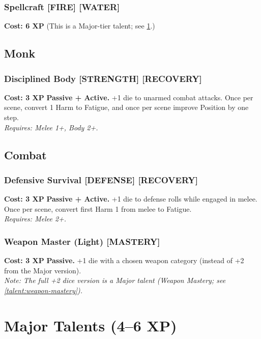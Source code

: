 \subsubsection*{Spellcraft \textnormal{[FIRE] [WATER]}}
\label{talent:spellcraft}
\textbf{Cost: 6 XP} (This is a Major-tier talent; see \ref{sec:major-talents}.)

\subsection*{Monk}
\label{sec:minor-monk}

\subsubsection*{Disciplined Body \textnormal{[STRENGTH] [RECOVERY]}}
\label{talent:disciplined-body}
\textbf{Cost: 3 XP} \textbf{Passive + Active.} +1 die to unarmed combat attacks. Once per scene, convert 1 Harm to Fatigue, and once per scene improve Position by one step. \\
\textit{Requires: Melee 1+, Body 2+.}

\subsection*{Combat}
\label{sec:minor-combat}

\subsubsection*{Defensive Survival \textnormal{[DEFENSE] [RECOVERY]}}
\label{talent:defensive-survival}
\textbf{Cost: 3 XP} \textbf{Passive + Active.} +1 die to defense rolls while engaged in melee. Once per scene, convert first Harm 1 from melee to Fatigue. \\
\textit{Requires: Melee 2+.}

\subsubsection*{Weapon Master (Light) \textnormal{[MASTERY]}}
\label{talent:weapon-master-light}
\textbf{Cost: 3 XP} \textbf{Passive.} +1 die with a chosen weapon category (instead of +2 from the Major version). \\
\textit{Note: The full +2 dice version is a Major talent (Weapon Mastery; see \ref{talent:weapon-mastery}).}

\section{Major Talents (4–6 XP)}
\label{sec:major-talents}

